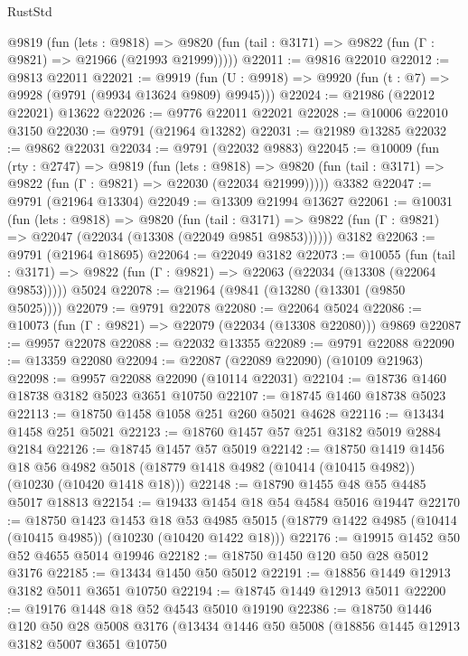 \begin{lexlean}{RustStd}
\begin{coremodule}
    @9819
      (fun (lets : @9818) =>
      @9820 (fun (tail : @3171) => @9822 (fun (Γ : @9821) => @21966 (@21993 @21999)))))
@22011 := @9816 @22010
@22012 := @9813 @22011
@22021 := @9919
    (fun (U : @9918) => @9920 (fun (t : @7) => @9928 (@9791 (@9934 @13624 @9809) @9945)))
@22024 := @21986 (@22012 @22021) @13622
@22026 := @9776 @22011 @22021
@22028 := @10006 @22010 @3150
@22030 := @9791 (@21964 @13282)
@22031 := @21989 @13285
@22032 := @9862 @22031
@22034 := @9791 (@22032 @9883)
@22045 := @10009
    (fun (rty : @2747) =>
    @9819
      (fun (lets : @9818) =>
      @9820 (fun (tail : @3171) => @9822 (fun (Γ : @9821) => @22030 (@22034 @21999)))))
    @3382
@22047 := @9791 (@21964 @13304)
@22049 := @13309 @21994 @13627
@22061 := @10031
    (fun (lets : @9818) =>
    @9820
      (fun (tail : @3171) =>
      @9822 (fun (Γ : @9821) => @22047 (@22034 (@13308 (@22049 @9851 @9853))))))
    @3182
@22063 := @9791 (@21964 @18695)
@22064 := @22049 @3182
@22073 := @10055
    (fun (tail : @3171) => @9822 (fun (Γ : @9821) => @22063 (@22034 (@13308 (@22064 @9853)))))
    @5024
@22078 := @21964 (@9841 (@13280 (@13301 (@9850 @5025))))
@22079 := @9791 @22078
@22080 := @22064 @5024
@22086 := @10073 (fun (Γ : @9821) => @22079 (@22034 (@13308 @22080))) @9869
@22087 := @9957 @22078
@22088 := @22032 @13355
@22089 := @9791 @22088
@22090 := @13359 @22080
@22094 := @22087 (@22089 @22090) (@10109 @21963)
@22098 := @9957 @22088 @22090 (@10114 @22031)
@22104 := @18736 @1460 @18738 @3182 @5023 @3651 @10750
@22107 := @18745 @1460 @18738 @5023
@22113 := @18750 @1458 @1058 @251 @260 @5021 @4628
@22116 := @13434 @1458 @251 @5021
@22123 := @18760 @1457 @57 @251 @3182 @5019 @2884 @2184
@22126 := @18745 @1457 @57 @5019
@22142 := @18750
    @1419
    @1456
    @18
    @56
    @4982
    @5018
    (@18779 @1418 @4982 (@10414 (@10415 @4982)) (@10230 (@10420 @1418 @18)))
@22148 := @18790 @1455 @48 @55 @4485 @5017 @18813
@22154 := @19433 @1454 @18 @54 @4584 @5016 @19447
@22170 := @18750
    @1423
    @1453
    @18
    @53
    @4985
    @5015
    (@18779 @1422 @4985 (@10414 (@10415 @4985)) (@10230 (@10420 @1422 @18)))
@22176 := @19915 @1452 @50 @52 @4655 @5014 @19946
@22182 := @18750 @1450 @120 @50 @28 @5012 @3176
@22185 := @13434 @1450 @50 @5012
@22191 := @18856 @1449 @12913 @3182 @5011 @3651 @10750
@22194 := @18745 @1449 @12913 @5011
@22200 := @19176 @1448 @18 @52 @4543 @5010 @19190
@22386 := @18750
    @1446
    @120
    @50
    @28
    @5008
    @3176
    (@13434
      @1446
      @50
      @5008
      (@18856
        @1445
        @12913
        @3182
        @5007
        @3651
        @10750

\end{coremodule}
\end{lexlean}
